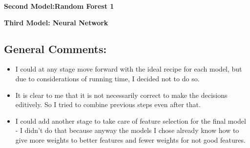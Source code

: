 \documentclass[
]{article}
\newenvironment{Shaded}{\begin{snugshade}}{\end{snugshade}}
\newcommand{\DecValTok}[1]{\textcolor[rgb]{0.00,0.00,0.81}{#1}}
\newcommand{\KeywordTok}[1]{\textcolor[rgb]{0.13,0.29,0.53}{\textbf{#1}}}
\newcommand{\NormalTok}[1]{#1}
\newcommand{\OperatorTok}[1]{\textcolor[rgb]{0.81,0.36,0.00}{\textbf{#1}}}
\newcommand{\StringTok}[1]{\textcolor[rgb]{0.31,0.60,0.02}{#1}}
\providecommand{\tightlist}{%
  \setlength{\itemsep}{0pt}\setlength{\parskip}{0pt}}
\begin{document}
\textbf{Second Model:Random Forest 1}

\begin{Shaded}
\end{Shaded}

\textbf{Third Model: Neural Network}

\begin{Shaded}
\end{Shaded}

\hypertarget{general-comments}{%
\subsection{General Comments:}\label{general-comments}}

\begin{itemize}
\tightlist
\item
  I could at any stage move forward with the ideal recipe for each
  model, but due to considerations of running time, I decided not to do
  so.
\item
  It is clear to me that it is not necessarily correct to make the
  decisions editively. So I tried to combine previous steps even after
  that.
\item
  I could add another stage to take care of feature selection for the
  final model - I didn't do that because anyway the models I chose
  already know how to give more weights to better features and fewer
  weights for not good features.
\end{itemize}
\end{document}
